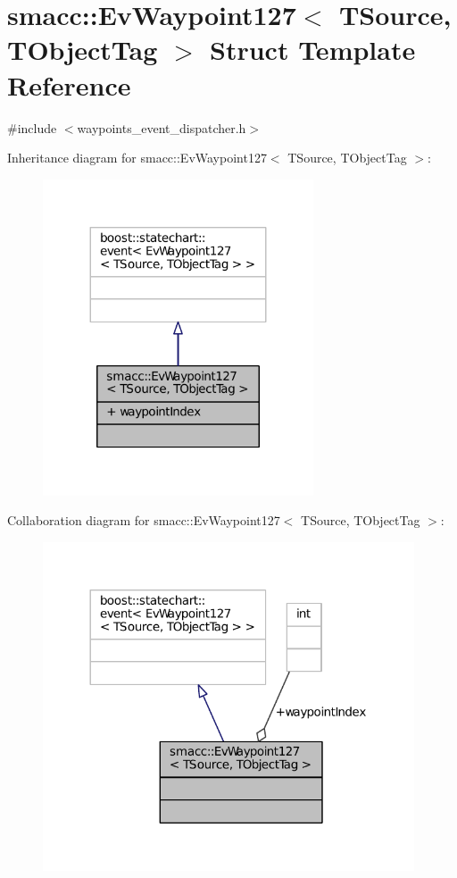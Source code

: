 \hypertarget{structsmacc_1_1EvWaypoint127}{}\section{smacc\+:\+:Ev\+Waypoint127$<$ T\+Source, T\+Object\+Tag $>$ Struct Template Reference}
\label{structsmacc_1_1EvWaypoint127}


{\ttfamily \#include $<$waypoints\+\_\+event\+\_\+dispatcher.\+h$>$}



Inheritance diagram for smacc\+:\+:Ev\+Waypoint127$<$ T\+Source, T\+Object\+Tag $>$\+:
\nopagebreak
\begin{figure}[H]
\begin{center}
\leavevmode
\includegraphics[width=227pt]{structsmacc_1_1EvWaypoint127__inherit__graph}
\end{center}
\end{figure}


Collaboration diagram for smacc\+:\+:Ev\+Waypoint127$<$ T\+Source, T\+Object\+Tag $>$\+:
\nopagebreak
\begin{figure}[H]
\begin{center}
\leavevmode
\includegraphics[width=312pt]{structsmacc_1_1EvWaypoint127__coll__graph}
\end{center}
\end{figure}
